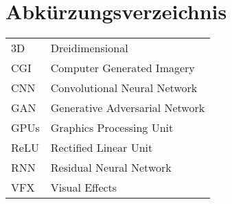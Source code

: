 \chapter*{Abkürzungsverzeichnis}
\thispagestyle{plain}

\begin{table}[ht]

\begin{tabularx}{\textwidth}{lX}
         3D	&	Dreidimensional	\\
CGI	&	Computer Generated Imagery	\\
CNN	&	Convolutional Neural Network	\\
GAN	&	Generative Adversarial Network	\\
GPUs	&	Graphics Processing Unit	\\
ReLU	&	Rectified Linear Unit	\\
RNN	&	Residual Neural Network	\\
VFX	&	Visual Effects	\\

    \end{tabularx}

    \label{tab:my_label4}
\end{table}